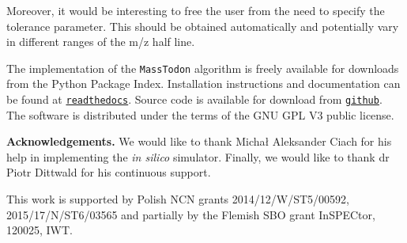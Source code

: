 \documentclass[journal=ancham, manuscript=article, layout=twocolumn]{achemso}
\begin{document}
Moreover, it would be interesting to free the user from the need to specify the tolerance parameter. 
This should be obtained automatically and potentially vary in different ranges of the m/z half line.

The implementation of the {\tt MassTodon} algorithm is freely available for downloads from the Python Package Index.
Installation instructions and documentation can be found at \href{http://masstodonpy.readthedocs.io}{\tt readthedocs}.
Source code is available for download from \href{https://matteolacki.github.io/MassTodonPy/}{\tt github}.
The software is distributed under the terms of the GNU GPL V3 public license.

\noindent\textbf{Acknowledgements.}
We would like to thank Michał Aleksander Ciach for his help in implementing the \textit{in silico} simulator.
Finally, we would like to thank dr Piotr Dittwald for his continuous support.

This work is supported by Polish NCN grants 2014/12/W/ST5/00592, 2015/17/N/ST6/03565 and partially by the Flemish SBO grant InSPECtor, 120025, IWT.



{\scriptsize}
\end{document}
